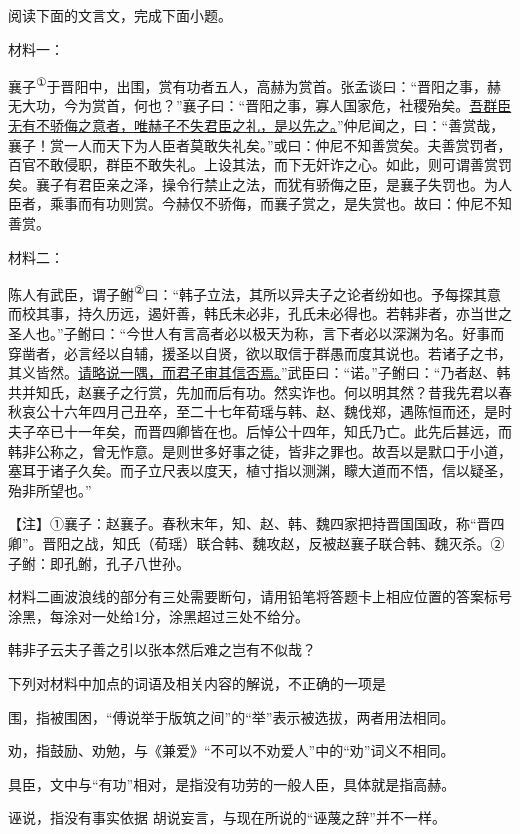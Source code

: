 \documentclass{exam-zh}
\newcommand{\dotemph}[1]{\CJKunderdot{#1}}
\begin{document}
阅读下面的文言文，完成下面小题。

材料一：
\begin{material}[source=（节选自《韩非子·难一》）]
    襄子\textsuperscript{①}\dotemph{围}于晋阳中，出围，赏有功者五人，高赫为赏首。张孟谈曰：“晋阳之事，赫无大功，今为赏首，何也？”襄子曰：“晋阳之事，寡人国家危，社稷殆矣。\uline{吾群臣无有不骄侮之意者，唯赫子不失君臣之礼，是以先之。}”仲尼闻之，曰：“善赏哉，襄子！赏一人而天下为人臣者莫敢失礼矣。”或曰：仲尼不知善赏矣。夫善赏罚者，百官不敢侵职，群臣不敢失礼。上设其法，而下无奸诈之心。如此，则可谓善赏罚矣。襄子有君臣亲之泽，操令行禁止之法，而犹有骄侮之臣，是襄子失罚也。为人臣者，乘事而有功则赏。今赫仅不骄侮，而襄子赏之，是失赏也。故曰：仲尼不知善赏。
\end{material}

材料二：
\begin{material}[source=（节选自《孔丛子·答问》）]
    陈人有武臣，谓子鲋\textsuperscript{②}曰：“韩子立法，其所以异夫子之论者纷如也。予每探其意而校其事，持久历远，遏奸\dotemph{劝}善，韩氏未必非，孔氏未必得也。若韩非者，亦当世之圣人也。”子鲋曰：“今世人有言高者必以极天为称，言下者必以深渊为名。好事而穿凿者，必言经以自辅，援圣以自贤，欲以取信于群愚而度其说也。若诸子之书，其义皆然。\uline{请略说一隅，而君子审其信否焉。}”武臣曰：“诺。”子鲋曰：“乃者赵、韩共并知氏，赵襄子之行赏，先加\dotemph{具臣}而后有功。然实诈也。何以明其然？昔我先君以春秋哀公十六年四月己丑卒，至二十七年荀瑶与韩、赵、魏伐郑，遇陈恒而还，是时夫子卒已十一年矣，而晋四卿皆在也。后悼公十四年，知氏乃亡。此先后甚远，而韩非公称之，曾无怍意。是则世多好事之徒，皆非之罪也。故吾以是默口于小道，塞耳于诸子久矣。而子立尺表以度天，植寸指以测渊，矇大道而不悟，信\dotemph{诬说}以疑圣，殆非所望也。”
\end{material}

{\fangsong【注】①襄子：赵襄子。春秋末年，知、赵、韩、魏四家把持晋国国政，称“晋四卿”。晋阳之战，知氏（荀瑶）联合韩、魏攻赵，反被赵襄子联合韩、魏灭杀。②子鲋：即孔鲋，孔子八世孙。}

\begin{question}[points=3]
    材料二画波浪线的部分有三处需要断句，请用铅笔将答题卡上相应位置的答案标号涂黑，每涂对一处给1分，涂黑超过三处不给分。
\end{question}

韩非子云夫子善之引以张本然后难之岂有不似哉？

\begin{question}[points=3]
    下列对材料中加点的词语及相关内容的解说，不正确的一项是\paren
    \begin{choices}
        \item 围，指被围困，“傅说举于版筑之间”的“举”表示被选拔，两者用法相同。
        \item 劝，指鼓励、劝勉，与《兼爱》“不可以不劝爱人”中的“劝”词义不相同。
        \item 具臣，文中与“有功”相对，是指没有功劳的一般人臣，具体就是指高赫。
        \item 诬说，指没有事实依据 胡说妄言，与现在所说的“诬蔑之辞”并不一样。
    \end{choices}
\end{question}
\end{document}
